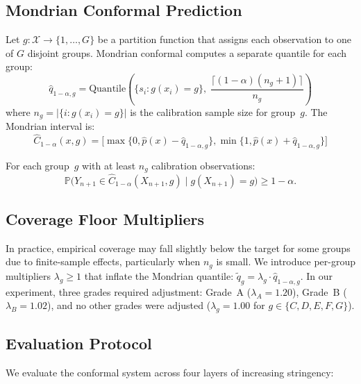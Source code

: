 \documentclass[pmlr]{jmlr}
\newcommand{\PD}{\hat{p}}
\newcommand{\PP}{\mathbb{P}}
\newcommand{\qqg}{\hat{q}_{1-\alpha,g}}
\newcommand{\Ccal}{\hat{C}_{1-\alpha}}
\begin{document}
\subsection{Mondrian Conformal Prediction}

Let $g: \mathcal{X} \to \{1, \ldots, G\}$ be a partition function that assigns
each observation to one of $G$ disjoint groups.  Mondrian conformal computes a
separate quantile for each group:
\begin{equation}
    \qqg = \text{Quantile}\!\left(\{s_i : g(x_i) = g\},\;
    \frac{\lceil(1-\alpha)(n_g+1)\rceil}{n_g}\right)
    \label{eq:mondrian-quantile}
\end{equation}
where $n_g = |\{i : g(x_i) = g\}|$ is the calibration sample size for
group~$g$.  The Mondrian interval is:
\begin{equation}
    \Ccal(x,g) = \bigl[\max\{0, \PD(x) - \qqg\}, \min\{1, \PD(x) + \qqg\}\bigr]
    \label{eq:mondrian-interval}
\end{equation}

\begin{theorem}
\label{thm:mondrian}
For each group~$g$ with at least $n_g$ calibration observations:
\begin{equation}
    \PP\bigl(Y_{n+1} \in \Ccal(X_{n+1}, g) \mid g(X_{n+1}) = g\bigr) \geq 1 - \alpha.
\end{equation}
\end{theorem}

\subsection{Coverage Floor Multipliers}

In practice, empirical coverage may fall slightly below the target for some
groups due to finite-sample effects, particularly when $n_g$ is small.  We
introduce per-group multipliers $\lambda_g \geq 1$ that inflate the Mondrian
quantile: $\tilde{q}_g = \lambda_g \cdot \qqg$.  In our experiment, three
grades required adjustment: Grade~A ($\lambda_A = 1.20$), Grade~B
($\lambda_B = 1.02$), and no other grades were adjusted ($\lambda_g = 1.00$
for $g \in \{C,D,E,F,G\}$).

\subsection{Evaluation Protocol}

We evaluate the conformal system across four layers of increasing stringency:
\end{document}

